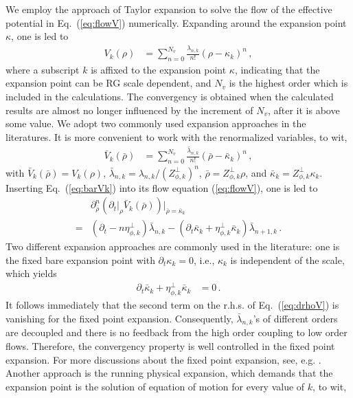 \documentclass[%
reprint,
superscriptaddress,
showpacs,preprintnumbers,
 amsmath,amssymb,
 aps,
prd,
]{revtex4-1}
\def\Eq#1{Eq.~(\ref{#1})}
\begin{document}
We employ the approach of Taylor expansion to solve the flow of the effective potential in \Eq{eq:flowV} numerically. Expanding around the expansion point $\kappa$, one is led to 
\begin{align}\label{}
  V_k(\rho)&=\sum^{N_v}_{n=0}\frac{\lambda_{n,k}}{n!}(\rho-\kappa_k)^n\,,\label{}
\end{align}
where a subscript $k$ is affixed to the expansion point $\kappa$, indicating that the expansion point can be RG scale dependent, and $N_v$ is the highest order which is included in the calculations. The convergency is obtained when the calculated results are almost no longer influenced by the increment of $N_v$, after it is above some value. We adopt two commonly used expansion approaches in the literatures. It is more convenient to work with the renormalized variables, to wit,
\begin{align}
  \bar V_k(\bar \rho)&=\sum^{N_v}_{n=0}\frac{\bar \lambda_{n,k}}{n!}(\bar \rho-\bar \kappa_k)^n\,,\label{eq:barVk}
\end{align}
with $\bar V_k(\bar \rho)=V_k(\rho)$, $\bar \lambda_{n,k}=\lambda_{n,k}/(Z^{\perp}_{\phi,k})^n$, $\bar \rho=Z^{\perp}_{\phi,k} \rho$, and $\bar \kappa_k=Z^{\perp}_{\phi,k}\kappa_k$. Inserting \Eq{eq:barVk} into its flow equation (\ref{eq:flowV}), one is led to
\begin{align}
  &\partial^n_{\bar \rho}\left(\partial_t\big|_{\rho} \bar V_k(\bar \rho)\right)\Big|_{\bar \rho=\bar \kappa_k}\nonumber\\[2ex]
=&(\partial_t -n\eta_{\phi,k}^{\perp})\bar{\lambda}_{n,k}-(\partial_t \bar \kappa_k+\eta_{\phi,k}^{\perp}\bar \kappa_k)\bar \lambda_{n+1,k}\,.\label{eq:drhoV}
\end{align}
Two different expansion approaches are commonly used in the literature: one is the fixed bare expansion point with $\partial_t \kappa_k=0$, i.e., $\kappa_k$ is independent of the scale, which yields 
\begin{align}
  \partial_t \bar \kappa_k+\eta_{\phi,k}^{\perp}\bar \kappa_k&=0\,.\label{eq:dtkappafix}
\end{align}
It follows immediately that the second term on the r.h.s. of \Eq{eq:drhoV} is vanishing for the fixed point expansion. Consequently, $\bar \lambda_{n,k}$'s of different orders are decoupled and there is no feedback from the high order coupling to low order flows. Therefore,  the convergency property is well controlled in the fixed point expansion. For more discussions about the fixed point expansion, see, e.g. \cite{Pawlowski:2014zaa}. Another approach is the running physical expansion, which demands that the expansion point is the solution of equation of motion for every value of $k$, to wit,
\end{document}
